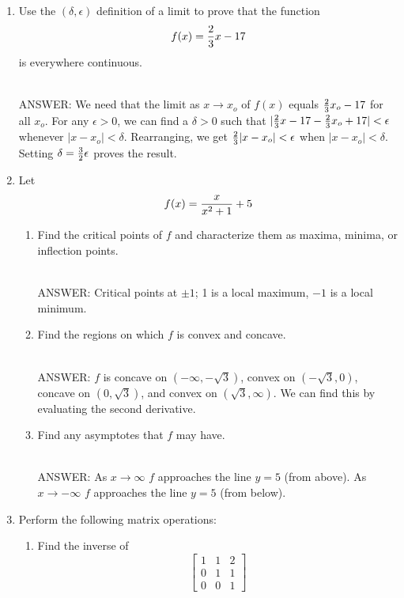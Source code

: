 \documentclass[11pt]{article}
\begin{document}
\begin{enumerate}
\vspace{.2in}

\item Use the $(\delta, \epsilon)$ definition of a limit to prove that the function $$f(x)={2\over 3}x-17$$ is everywhere continuous.

\ \\ANSWER:  We need that the limit as $x\rightarrow x_o$ of $f(x)$ equals ${2\over 3}x_o-17$ for all $x_o$.  For any $\epsilon>0$, we can find a $\delta>0$ such that $|{2\over 3}x-17-{2\over 3}x_o+17|<\epsilon$ whenever $|x-x_o|<\delta$.  Rearranging, we get ${2\over 3}|x-x_o|<\epsilon$ when $|x-x_o|<\delta$.  Setting $\delta={3\over 2} \epsilon$ proves the result.

\vspace{.2in}
\item Let $$f(x)={{x}\over{x^2+1}}+5$$
\begin{enumerate}
\item Find the critical points of $f$ and characterize them as maxima, minima, or inflection points.

\ \\ANSWER:  Critical points at $\pm 1$; 1 is a local maximum, $-1$ is a local minimum.

\item Find the regions on which $f$ is convex and concave.

\ \\ANSWER:  $f$ is concave on $(-\infty, -\sqrt{3})$, convex on $(-\sqrt{3}, 0)$, concave on $(0, \sqrt{3})$, and convex on $(\sqrt{3}, \infty)$.  We can find this by evaluating the second derivative. 

\item Find any asymptotes that $f$ may have.

\ \\ANSWER:   As $x\rightarrow \infty$ $f$ approaches the line $y=5$ (from above). As $x\rightarrow -\infty$ $f$ approaches the line $y=5$ (from below). 

\end{enumerate}

\item Perform the following matrix operations:

\begin{enumerate}

\item Find the inverse of $$\begin{bmatrix}1 & 1& 2\\ 0& 1& 1\\0&0&1
\end{bmatrix}$$



\end{enumerate}
\end{enumerate}
\end{document}
